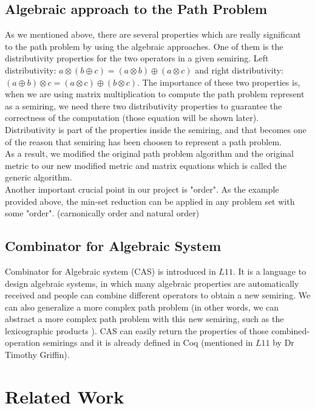 \documentclass[a4paper,12pt,twoside,openright]{report}
\begin{document}
\section{Algebraic approach to the Path Problem}
As we mentioned above, there are several properties which are really significant to the path problem by using the algebraic approaches. One of them is the distributivity properties for the two operators in a given semiring. 
Left distributivity: $a \otimes (b \oplus c) = (a \otimes b) \oplus (a \otimes c)$ and right distributivity:  $(a \oplus b) \otimes c = (a \otimes c) \oplus (b \otimes c)$. The importance of these two properties is, when we are using matrix multiplication to compute the path problem represent as a semiring, we need there two distributivity properties to guarantee the correctness of the computation (those equation will be shown later). Distributivity is part of the properties inside the semiring, and that becomes one of the reason that semiring has been choosen to represent a path problem.\\
As a result, we modified the original path problem algorithm and the original metric to our new modified metric and matrix equations which is called the generic algorithm.\\
Another important crucial point in our project is "order". As the example provided above, the min-set reduction can be applied in any problem set with some "order". (carnonically order and natural order)\\

\section{Combinator for Algebraic System}
Combinator for Algebraic system (CAS)\cite{griffin_metarouting_2005} is introduced in $L11$. It is a language to design algebraic systems, in which many algebraic properties are automatically received and people can combine different operators to obtain a new semiring\cite{griffin_metarouting_2005}. We can also generalize a more complex path problem (in other words, we can abstract a more complex path problem with this new semiring, such as the lexicographic products \cite{gurney_lexicographic_2007}). CAS can easily return the properties of those combined-operation semirings and it is already defined in Coq\cite{Coq} (mentioned in $L11$ by Dr Timothy Griffin).

\chapter{Related Work} 
\end{document}
